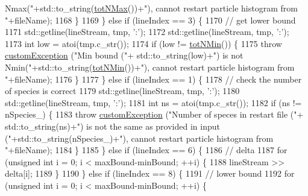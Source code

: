 \begin{DoxyCode}
{       Nmax("}+std::to\_string(\hyperlink{classsim_system_aee2c65ecb43a35c0c4d070cdb45f7dc0}{totNMax}())+\textcolor{stringliteral}{"), cannot restart particle histogram from "}+fileName);
1168                 \}
1169             \} \textcolor{keywordflow}{else} \textcolor{keywordflow}{if} (lineIndex == 3) \{
1170                 \textcolor{comment}{// get lower bound}
1171                 std::getline(lineStream, tmp, \textcolor{charliteral}{':'});
1172                 std::getline(lineStream, tmp, \textcolor{charliteral}{':'});
1173                 \textcolor{keywordtype}{int} low = atoi(tmp.c\_str());
1174                 \textcolor{keywordflow}{if} (low != \hyperlink{classsim_system_af10842e0eaa638373b8717c87b47e6bc}{totNMin}()) \{
1175                     \textcolor{keywordflow}{throw} \hyperlink{classcustom_exception}{customException} (\textcolor{stringliteral}{"Min bound ("}+ std::to\_string(low)+\textcolor{stringliteral}{") is not
       Nmin("}+std::to\_string(\hyperlink{classsim_system_af10842e0eaa638373b8717c87b47e6bc}{totNMin}())+\textcolor{stringliteral}{"), cannot restart particle histogram from "}+fileName);
1176                 \}
1177             \} \textcolor{keywordflow}{else} \textcolor{keywordflow}{if} (lineIndex == 1) \{
1178                 \textcolor{comment}{// check the number of species is correct}
1179                 std::getline(lineStream, tmp, \textcolor{charliteral}{':'});
1180                 std::getline(lineStream, tmp, \textcolor{charliteral}{':'});
1181                 \textcolor{keywordtype}{int} ns = atoi(tmp.c\_str());
1182                 \textcolor{keywordflow}{if} (ns != nSpecies\_) \{
1183                     \textcolor{keywordflow}{throw} \hyperlink{classcustom_exception}{customException} (\textcolor{stringliteral}{"Number of speces in restart file ("}+ 
      std::to\_string(ns)+\textcolor{stringliteral}{") is not the same as provided in input ("}+std::to\_string(nSpecies\_)+\textcolor{stringliteral}{"), cannot restart particle
       histogram from "}+fileName);
1184                 \}
1185             \} \textcolor{keywordflow}{else} \textcolor{keywordflow}{if} (lineIndex == 6) \{
1186                 \textcolor{comment}{// delta}
1187                 \textcolor{keywordflow}{for} (\textcolor{keywordtype}{unsigned} \textcolor{keywordtype}{int} i = 0; i < maxBound-minBound; ++i) \{
1188                     lineStream >> delta[i];
1189                 \}
1190             \} \textcolor{keywordflow}{else} \textcolor{keywordflow}{if} (lineIndex == 8) \{
1191                 \textcolor{comment}{// lower bound}
1192                 \textcolor{keywordflow}{for} (\textcolor{keywordtype}{unsigned} \textcolor{keywordtype}{int} i = 0; i < maxBound-minBound; ++i) \{

\end{DoxyCode}
